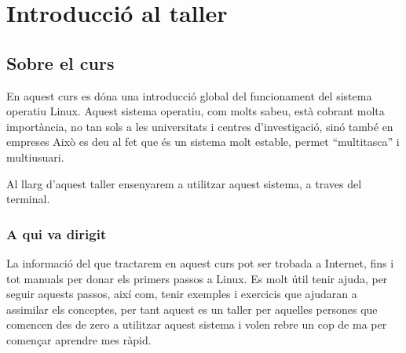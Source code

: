 \section{Introducció al taller}

\subsection{Sobre el curs}

\par
En aquest curs es dóna una introducció global del funcionament del sistema operatiu Linux.
Aquest sistema operatiu, com molts sabeu, està cobrant molta importància, no tan sols a les universitats i centres d'investigació, sinó també en empreses
Això es deu al fet que és un sistema molt estable, permet ``multitasca'' i multiusuari.
\par
Al llarg d'aquest taller ensenyarem a utilitzar aquest sistema, a traves del terminal.

\subsubsection{A qui va dirigit}

\par
La informació del que tractarem en aquest curs pot ser trobada a Internet, fins i tot manuals per donar els primers passos a Linux.
Es molt útil tenir ajuda, per seguir aquests passos, així com, tenir exemples i exercicis que ajudaran a assimilar els conceptes, per tant aquest es un taller per aquelles persones que comencen des de zero a utilitzar aquest sistema i volen rebre un cop de ma per començar aprendre mes ràpid.